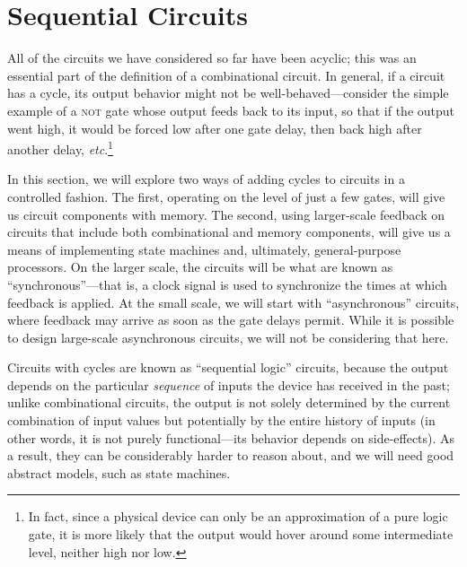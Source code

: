
\section{Sequential Circuits}
All of the circuits we have considered so far have been acyclic; this was an essential part of the definition of a combinational circuit. In general, if a circuit has a cycle, its output behavior might not be well-behaved---consider the simple example of a \textsc{not} gate whose output feeds back to its input, so that if the output went high, it would be forced low after one gate delay, then back high after another delay, \textit{etc}.\footnote{In fact, since a physical device can only be an approximation of a pure logic gate, it is more likely that the output would hover around some intermediate level, neither high nor low.}

In this section, we will explore two ways of adding cycles to circuits in a controlled fashion. The first, operating on the level of just a few gates, will give us circuit components with memory. The second, using larger-scale feedback on circuits that include both combinational and memory components, will give us a means of implementing state machines and, ultimately, general-purpose processors. On the larger scale, the circuits will be what are known as ``synchronous''---that is, a clock signal is used to synchronize the times at which feedback is applied. At the small scale, we will start with ``asynchronous'' circuits, where feedback may arrive as soon as the gate delays permit. While it is possible to design large-scale asynchronous circuits, we will not be considering that here.

Circuits with cycles are known as ``sequential logic'' circuits, because the output depends on the particular \emph{sequence} of inputs the device has received in the past; unlike combinational circuits, the output is not solely determined by the current combination of input values but potentially by the entire history of inputs (in other words, it is not purely functional---its behavior depends on side-effects). As a result, they can be considerably harder to reason about, and we will need good abstract models, such as state machines.

